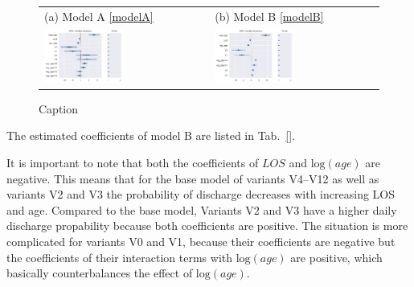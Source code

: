 \begin{figure}
    \centering
    \begin{tabular}{ll}
(a) Model A \eqref{modelA} & (b) Model B \eqref{modelB}\\
\includegraphics[width=0.5\textwidth]{images/DS19fm0_c0__forestplot_model_A.pdf}&
\includegraphics[width=0.5\textwidth]{images/DS19fk1_c0__forestplot_model_B}\\
\end{tabular}
    \caption{Caption}
    \label{fig:forest_plots}
\end{figure}

The estimated coefficients of model B are listed in Tab.~\ref{}.



It is important to note that both the coefficients of $LOS$ and $\text{log}(age)$ are negative. This means that for the base model of variants V4--V12 as well as variants V2 and V3 the probability of discharge decreases with increasing LOS and age. 
Compared to the base model, Variants V2 and V3 have a higher daily discharge propability because both coefficients are positive. 
The situation is more complicated for variants V0 and V1, because their coefficients are negative but the coefficients of their interaction terms with $\text{log}(age)$ are positive, which basically counterbalances the effect of $\text{log}(age)$.

